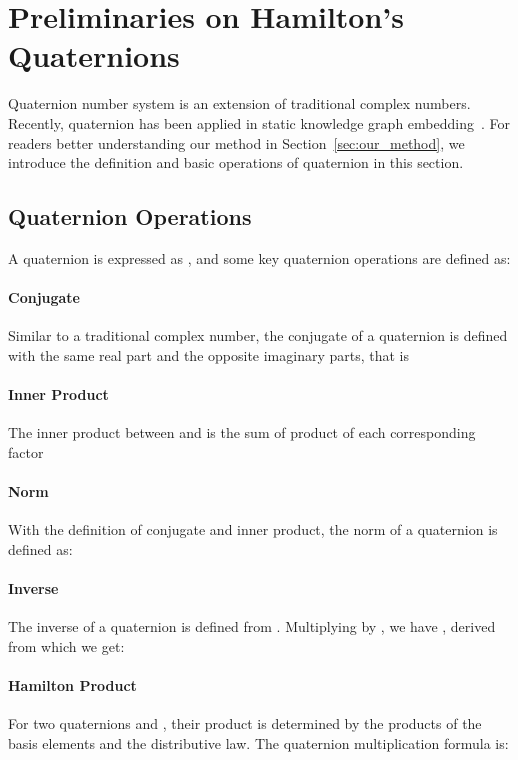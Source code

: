 \documentclass[11pt]{article}
\newcommand{\secref}[1]{Section~\ref{#1}\xspace}
\begin{document}
\section{Preliminaries on Hamilton’s Quaternions}
\label{Quaternion}

Quaternion number system \cite{Hamilton1844} is an extension of traditional complex numbers.
Recently, quaternion has been applied in static knowledge graph embedding~\cite{zhang2019quaternion,gao2020rotate3d}.
For readers better understanding our method in \secref{sec:our_method}, we introduce the definition and basic operations of quaternion in this section.


\subsection{Quaternion Operations}
A quaternion is expressed as , and some key quaternion operations are defined as:

\paragraph{Conjugate}
Similar to a traditional complex number, the conjugate of a quaternion is defined with the same real part and the opposite imaginary parts, that is 

\paragraph{Inner Product}
The inner product between  and  is the sum of product of each corresponding factor


\paragraph{Norm}
With the definition of conjugate and inner product, the norm of a quaternion is defined as:


\paragraph{Inverse}
The inverse of a quaternion is defined from .
Multiplying by , we have , derived from which we get:


\paragraph{Hamilton Product}
For two quaternions  and , their product is determined by the products of the basis elements and the distributive law.
The quaternion multiplication formula is:
\end{document}
